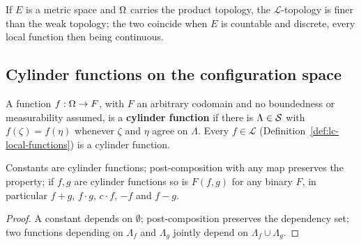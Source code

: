 \begin{remark}
    \label{rmk:lc-weak-topology}

    If $E$ is a metric space and $\Omega$ carries the product topology, the $\mathcal{L}$-topology
    is finer than the weak topology; the two coincide when $E$ is countable and discrete, every
    local function then being continuous.
\end{remark}

\subsection*{Cylinder functions on the configuration space}

\begin{definition}
    \label{def:lc-cylinder-function}
    \leanok

    A function $f : \Omega \to F$, with $F$ an arbitrary codomain and no boundedness or
    measurability assumed, is a \textbf{cylinder function} if there is $\Lambda \in \mathcal{S}$ with
    $f(\zeta) = f(\eta)$ whenever $\zeta$ and $\eta$ agree on $\Lambda$. Every
    $f \in \mathcal{L}$ (Definition~\ref{def:lc-local-functions}) is a cylinder function.
\end{definition}

\begin{lemma}
    \label{lem:lc-cylinder-function-algebra}
    \leanok

    Constants are cylinder functions; post-composition with any map preserves the property; if
    $f, g$ are cylinder functions so is $F(f, g)$ for any binary $F$, in particular $f + g$,
    $f \cdot g$, $c \cdot f$, $-f$ and $f - g$.
\end{lemma}
\begin{proof}
    \leanok

    A constant depends on $\emptyset$; post-composition preserves the dependency set; two
    functions depending on $\Lambda_f$ and $\Lambda_g$ jointly depend on
    $\Lambda_f \cup \Lambda_g$.
\end{proof}

